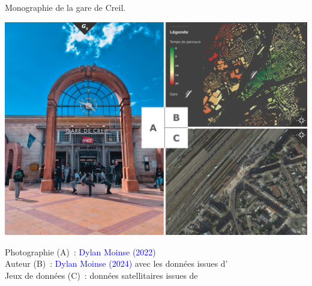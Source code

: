 \begin{refsegment}
        \begin{carte}[h!]\vspace*{4pt}
        \caption{Monographie de la gare de Creil.}
        \label{fig-chap3:monographie-creil}
        \centerline{\includegraphics[height=.35\pageheight]{src/Figures/Chap-3/FR_Gare_Creil.jpg}}
        \vspace{5pt}
        \begin{flushright}\scriptsize{
        Photographie (A)~: \textcolor{blue}{Dylan Moinse (2022)}
        \\
        Auteur (B)~: \textcolor{blue}{Dylan Moinse (2024)} avec les données issues d'\textcolor{blue}{\textcite{openstreetmap_openstreetmap_2023}}
        \\
      Jeux de données (C)~: données satellitaires issues de \textcolor{blue}{\textcite{google_earth_google_2023}}
      }\end{flushright}
      \end{carte}


\end{refsegment}
